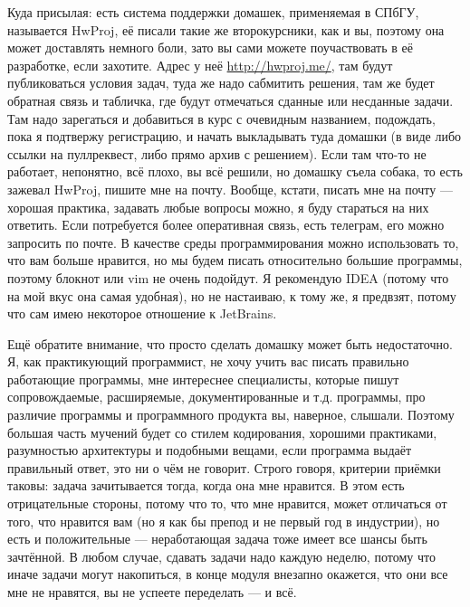\documentclass[a5paper]{article}
\begin{document}
Куда присылая: есть система поддержки домашек, применяемая в СПбГУ, называется HwProj, её писали такие же второкурсники, как и вы, поэтому она может доставлять немного боли, зато вы сами можете поучаствовать в её разработке, если захотите. Адрес у неё \url{http://hwproj.me/}, там будут публиковаться условия задач, туда же надо сабмитить решения, там же будет обратная связь и табличка, где будут отмечаться сданные или несданные задачи. Там надо зарегаться и добавиться в курс с очевидным названием, подождать, пока я подтвержу регистрацию, и начать выкладывать туда домашки (в виде либо ссылки на пуллреквест, либо прямо архив с решением). Если там что-то не работает, непонятно, всё плохо, вы всё решили, но домашку съела собака, то есть зажевал HwProj, пишите мне на почту. Вообще, кстати, писать мне на почту --- хорошая практика, задавать любые вопросы можно, я буду стараться на них ответить. Если потребуется более оперативная связь, есть телеграм, его можно запросить по почте. В качестве среды программирования можно использовать то, что вам больше нравится, но мы будем писать относительно большие программы, поэтому блокнот или vim не очень подойдут. Я рекомендую IDEA (потому что на мой вкус она самая удобная), но не настаиваю, к тому же, я предвзят, потому что сам имею некоторое отношение к JetBrains.

Ещё обратите внимание, что просто сделать домашку может быть недостаточно. Я, как практикующий программист, не хочу учить вас писать правильно работающие программы, мне интереснее специалисты, которые пишут сопровождаемые, расширяемые, документированные и т.д. программы, про различие программы и программного продукта вы, наверное, слышали. Поэтому большая часть мучений будет со стилем кодирования, хорошими практиками, разумностью архитектуры и подобными вещами, если программа выдаёт правильный ответ, это ни о чём не говорит. Строго говоря, критерии приёмки таковы: задача зачитывается тогда, когда она мне нравится. В этом есть отрицательные стороны, потому что то, что мне нравится, может отличаться от того, что нравится вам (но я как бы препод и не первый год в индустрии), но есть и положительные --- неработающая задача тоже имеет все шансы быть зачтённой. В любом случае, сдавать задачи надо каждую неделю, потому что иначе задачи могут накопиться, в конце модуля внезапно окажется, что они все мне не нравятся, вы не успеете переделать --- и всё.
\end{document}

